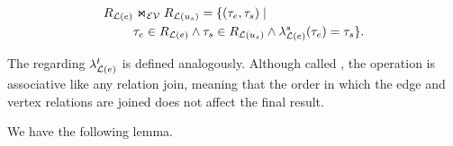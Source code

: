 \begin{equation} \label{eq:ev-join}
\begin{split}
R_{\mathcal{L}(e)} & \Join_\mathcal{EV} R_{\mathcal{L}(u_s)} = \{(\tau_e, \tau_s) \;|\; \\
  &  \tau_e \in R_{\mathcal{L}(e)} \land \tau_s \in R_{\mathcal{L}(u_s)} \land \lambda_{\mathcal{L}(e)}^s(\tau_e) = \tau_s\}.
\end{split}
\end{equation}

The \EVjoin regarding $\lambda_{\mathcal{L}(e)}^t$ is defined analogously. Although called \EVjoin, the operation is associative like any relation join, meaning that the order in which the edge and vertex relations are joined does not affect the final result.


We have the following lemma.

